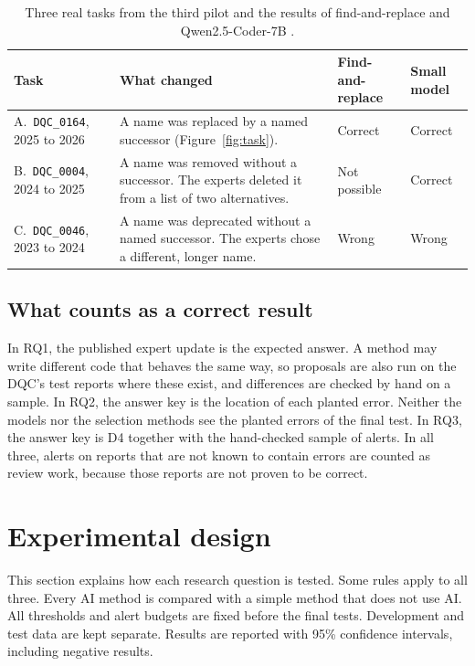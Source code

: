 \documentclass[11pt,a4paper]{article}
\let\oldsection\section
\renewcommand{\section}{\FloatBarrier\oldsection}
\let\oldsubsection\subsection
\renewcommand{\subsection}{\FloatBarrier\oldsubsection}
\begin{document}
\begin{table}[htb]
\centering
\small
\begin{tabularx}{\textwidth}{P{3.2cm} L P{2.0cm} P{2.0cm}}
\toprule
Task & What changed & Find-and-replace & Small model \\
\midrule
A.\ \texttt{DQC\_0164}, 2025 to 2026 & A name was replaced by a named successor (Figure~\ref{fig:task}). & Correct & Correct \\
B.\ \texttt{DQC\_0004}, 2024 to 2025 & A name was removed without a successor. The experts deleted it from a list of two alternatives. & Not possible & Correct \\
C.\ \texttt{DQC\_0046}, 2023 to 2024 & A name was deprecated without a named successor. The experts chose a different, longer name. & Wrong & Wrong \\
\bottomrule
\end{tabularx}
\caption{Three real tasks from the third pilot and the results of find-and-replace and Qwen2.5-Coder-7B \cite{pilotb}.}
\label{tab:cases}
\end{table}

\subsection{What counts as a correct result}
\label{sec:measures}

In RQ1, the published expert update is the expected answer. A method may write different code that behaves the same way, so proposals are also run on the DQC's test reports where these exist, and differences are checked by hand on a sample. In RQ2, the answer key is the location of each planted error. Neither the models nor the selection methods see the planted errors of the final test. In RQ3, the answer key is D4 together with the hand-checked sample of alerts. In all three, alerts on reports that are not known to contain errors are counted as review work, because those reports are not proven to be correct.

\section{Experimental design}
\label{sec:design}

This section explains how each research question is tested. Some rules apply to all three. Every AI method is compared with a simple method that does not use AI. All thresholds and alert budgets are fixed before the final tests. Development and test data are kept separate. Results are reported with 95\% confidence intervals, including negative results.
\end{document}
